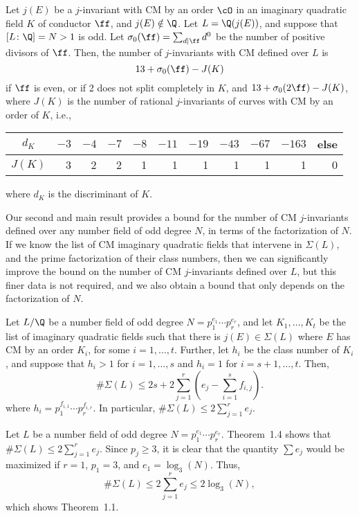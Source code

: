 \begin{thm} %
Let $j(E)$ be a $j$-invariant with CM by an order $\cO$ in an imaginary quadratic field $K$ of conductor $\ff$, and $j(E) \notin \Q$. Let $L= \Q(j(E))$, and suppose that $[L \colon \Q]= N > 1$ is odd. Let $\sigma_0(\ff)= \sum_{d \mid \ff} d^0$ be the number of positive divisors of $\ff$. Then, the number of $j$-invariants with CM defined over $L$ is
	\[
	13 + \sigma_0(\ff) - J(K)
	\]
if $\ff$ is even, or if 2 does not split completely in $K$, and $13 + \sigma_0(2\ff) - J(K)$, where $J(K)$ is the number of rational $j$-invariants of curves with CM by an order of $K$, i.e., 
	\begin{table}[!ht]
	\centering
	\begin{tabular}{c|rrrrrrrrrr}
	$d_K$ & $-3$ & $-4$ & $-7$ & $-8$ & $-11$ & $-19$ & $-43$ & $-67$ & $-163$ & else \\ \hline
	$J(K)$ & 3 & 2 & 2 & 1 & 1 & 1 & 1 & 1 & 1 & 0
	\end{tabular}
	\end{table}
where $d_K$ is the discriminant of $K$. 
\end{thm}


Our second and main result provides a bound for the number of CM $j$-invariants defined over any number field of odd degree $N$, in terms of the factorization of $N$. If we know the list of CM imaginary quadratic fields that intervene in $\Sigma(L)$, and the prime factorization of their class numbers, then we can significantly improve the bound on the number of CM $j$-invariants defined over $L$, but this finer data is not required, and we also obtain a bound that only depends on the factorization of $N$.


\begin{thm} %
Let $L/\Q$ be a number field of odd degree $N= p_1^{e_1} \cdots p_r^{e_r}$, and let $K_1, \ldots, K_t$ be the list of imaginary quadratic fields such that there is $j(E) \in \Sigma(L)$ where $E$ has CM by an order $K_i$, for some $i= 1,\ldots,t$. Further, let $h_i$ be the class number of $K_i$, and suppose that $h_i > 1$ for $i= 1,\ldots,s$ and $h_i= 1$ for $i= s+1,\ldots,t$. Then, 
	\[
	\#\Sigma(L) \leq 2s + 2 \sum_{j=1}^r \left(e_j - \sum_{i=1}^s f_{i,j} \right).
	\]
where $h_i= p_1^{f_{i,1}} \cdots p_r^{f_{i,r}}$. In particular, $\#\Sigma(L) \leq 2 \sum_{j=1}^r e_j$. 
\end{thm}


\begin{rem} %
Let $L$ be a number field of odd degree $N= p_1^{e_1} \cdots p_r^{e_r}$. Theorem~1.4 shows that $\#\Sigma(L) \leq 2 \sum_{j=1}^r e_j$. Since $p_j \geq 3$, it is clear that the quantity $\sum e_j$ would be maximized if $r= 1$, $p_1= 3$, and $e_1= \log_3(N)$. Thus,
	\[
	\#\Sigma(L) \leq 2 \sum_{j=1}^r e_j \leq 2 \log_3(N),
	\]
which shows Theorem~1.1. 
\end{rem}


